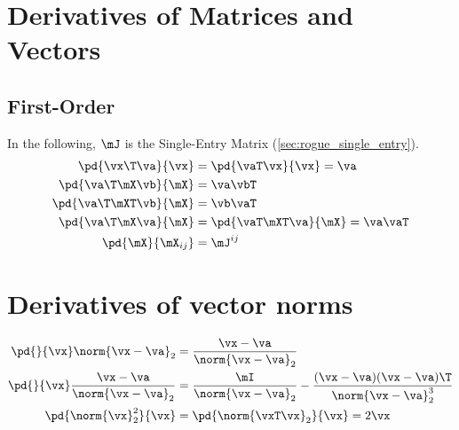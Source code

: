 \section{Derivatives of Matrices and Vectors}

\subsection{First-Order}

In the following, $\mJ$ is the Single-Entry Matrix (\autoref{sec:rogue_single_entry}).
\begin{align}
\pd{\vx\T \va}{\vx}     &= \pd{\vaT \vx}{\vx} = \va          \\
\pd{\va\T\mX\vb}{\mX}   &= \va\vbT                           \\
\pd{\va\T\mXT\vb}{\mX}  &= \vb\vaT                           \\
\pd{\va\T\mX\va}{\mX}   &= \pd{\vaT\mXT\va}{\mX} = \va\vaT \\
\pd{\mX}{\mX_{ij}}      &= \mJ^{ij}                              %
\end{align}

\section{Derivatives of vector norms}

\begin{align}
\pd{}{\vx}\norm{\vx-\va}_2 &= \frac{\vx-\va}{\norm{\vx-\va}_2} \\
\pd{}{\vx}\frac{\vx-\va}{\norm{\vx-\va}_2} &= \frac{\mI}{\norm{\vx-\va}_2}-\frac{(\vx-\va)(\vx-\va)\T}{\norm{\vx-\va}_2^3} \\
\pd{\norm{\vx}_2^2}{\vx} &= \pd{\norm{\vxT\vx}_2}{\vx} = 2\vx
\end{align}

